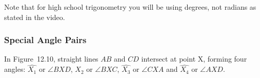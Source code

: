     \addtocounter{footnote}{-0}
    

Note that for high school trigonometry you will be using degrees, not radians as stated in the video. \par 
      
      \label{m39370*uid26}
            \subsubsection{ Special Angle Pairs}
            \nopagebreak
            
        
        \label{m39370*id315274}In Figure~12.10, straight lines \begin{math}AB\end{math} and \begin{math}CD\end{math} intersect at point X, forming four angles: \begin{math}\hat{{X}_{1}}\end{math} or \begin{math}\angle BXD\end{math}\hspace{1ex}, \begin{math}\hat{{X}_{2}}\end{math}\hspace{1ex} or \begin{math}\angle BXC\end{math}\hspace{1ex}, \begin{math}\hat{{X}_{3}}\end{math}\hspace{1ex} or \begin{math}\angle CXA\end{math}\hspace{1ex} and \begin{math}\hat{{X}_{4}}\end{math}\hspace{1ex} or \begin{math}\angle AXD\end{math}\hspace{1ex}.\par 
        
    \setcounter{subfigure}{0}


